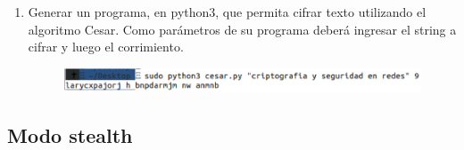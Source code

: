 \documentclass[letter,12pt]{article}
\begin{document}
\begin{enumerate}
\item Generar un programa, en python3, que permita cifrar texto utilizando el algoritmo Cesar. Como parámetros de su programa deberá ingresar el string a cifrar y luego el corrimiento.
\begin{figure}[H]
        \centering
        \includegraphics[width=15cm]{actividades/A1.png}
        \label{fig:a1}
\end{figure}


\end{enumerate}

\subsection{Modo stealth}
\end{document}
